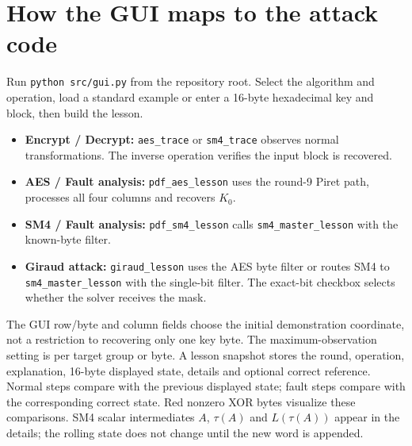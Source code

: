 \documentclass[11pt,a4paper]{report}
\begin{document}
\section{How the GUI maps to the attack code}
Run \texttt{python src/gui.py} from the repository root. Select the algorithm and operation, load a standard example or enter a 16-byte hexadecimal key and block, then build the lesson.
\begin{itemize}
\item \textbf{Encrypt / Decrypt:} \texttt{aes\_trace} or \texttt{sm4\_trace} observes normal transformations. The inverse operation verifies the input block is recovered.
\item \textbf{AES / Fault analysis:} \texttt{pdf\_aes\_lesson} uses the round-9 Piret path, processes all four columns and recovers $K_0$.
\item \textbf{SM4 / Fault analysis:} \texttt{pdf\_sm4\_lesson} calls \texttt{sm4\_master\_lesson} with the known-byte filter.
\item \textbf{Giraud attack:} \texttt{giraud\_lesson} uses the AES byte filter or routes SM4 to \texttt{sm4\_master\_lesson} with the single-bit filter. The exact-bit checkbox selects whether the solver receives the mask.
\end{itemize}
The GUI row/byte and column fields choose the initial demonstration coordinate, not a restriction to recovering only one key byte. The maximum-observation setting is per target group or byte. A lesson snapshot stores the round, operation, explanation, 16-byte displayed state, details and optional correct reference. Normal steps compare with the previous displayed state; fault steps compare with the corresponding correct state. Red nonzero XOR bytes visualize these comparisons. SM4 scalar intermediates $A$, $\tau(A)$ and $L(\tau(A))$ appear in the details; the rolling state does not change until the new word is appended.
\end{document}
